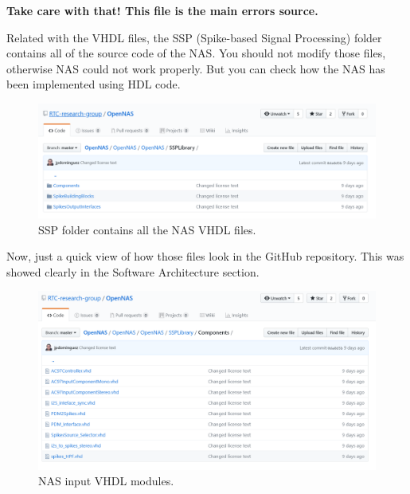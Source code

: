 \textbf{Take care with that! This file is the main errors source.}

Related with the VHDL files, the SSP (Spike-based Signal Processing) folder contains all of the source code of the NAS. You should not modify those files, otherwise NAS could not work properly. But you can check how the NAS has been implemented using HDL code. 

\begin{figure}[H]
\centering
\includegraphics[width=1\textwidth]{images/Img06_SSP.PNG}
\caption{\label{fig:OpenNAS_SSPFolder}SSP folder contains all the NAS VHDL files.}
\end{figure}

Now, just a quick view of how those files look in the GitHub repository. This was showed clearly in the Software Architecture section.

\begin{figure}[H]
\centering
\includegraphics[width=1\textwidth]{images/Img07_Components.PNG}
\caption{\label{fig:OpenNAS_SSP_Components}NAS input VHDL modules.}
\end{figure}


